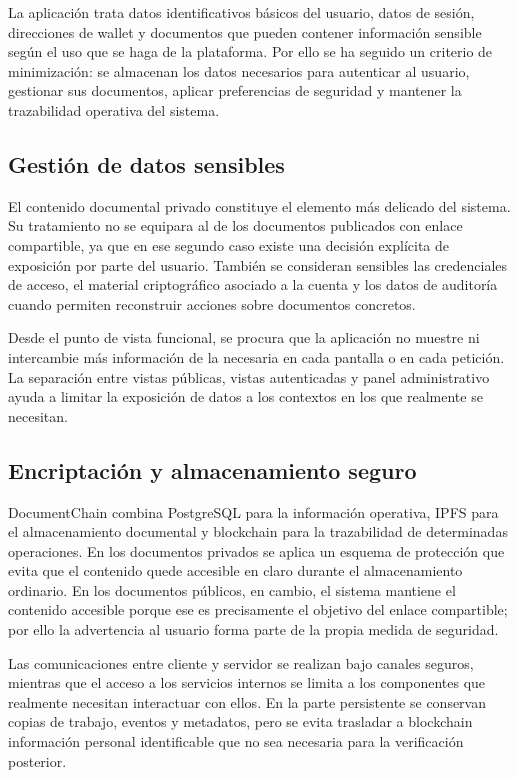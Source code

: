 \documentclass[11pt, a4paper]{article}
\begin{document}
La aplicación trata datos identificativos básicos del usuario, datos de sesión, direcciones de wallet y documentos que pueden contener información sensible según el uso que se haga de la plataforma. Por ello se ha seguido un criterio de minimización: se almacenan los datos necesarios para autenticar al usuario, gestionar sus documentos, aplicar preferencias de seguridad y mantener la trazabilidad operativa del sistema.

\subsection{Gestión de datos sensibles}

El contenido documental privado constituye el elemento más delicado del sistema. Su tratamiento no se equipara al de los documentos publicados con enlace compartible, ya que en ese segundo caso existe una decisión explícita de exposición por parte del usuario. También se consideran sensibles las credenciales de acceso, el material criptográfico asociado a la cuenta y los datos de auditoría cuando permiten reconstruir acciones sobre documentos concretos.

Desde el punto de vista funcional, se procura que la aplicación no muestre ni intercambie más información de la necesaria en cada pantalla o en cada petición. La separación entre vistas públicas, vistas autenticadas y panel administrativo ayuda a limitar la exposición de datos a los contextos en los que realmente se necesitan.

\subsection{Encriptación y almacenamiento seguro}

DocumentChain combina PostgreSQL para la información operativa, IPFS para el almacenamiento documental y blockchain para la trazabilidad de determinadas operaciones. En los documentos privados se aplica un esquema de protección que evita que el contenido quede accesible en claro durante el almacenamiento ordinario. En los documentos públicos, en cambio, el sistema mantiene el contenido accesible porque ese es precisamente el objetivo del enlace compartible; por ello la advertencia al usuario forma parte de la propia medida de seguridad.

Las comunicaciones entre cliente y servidor se realizan bajo canales seguros, mientras que el acceso a los servicios internos se limita a los componentes que realmente necesitan interactuar con ellos. En la parte persistente se conservan copias de trabajo, eventos y metadatos, pero se evita trasladar a blockchain información personal identificable que no sea necesaria para la verificación posterior.
\end{document}

